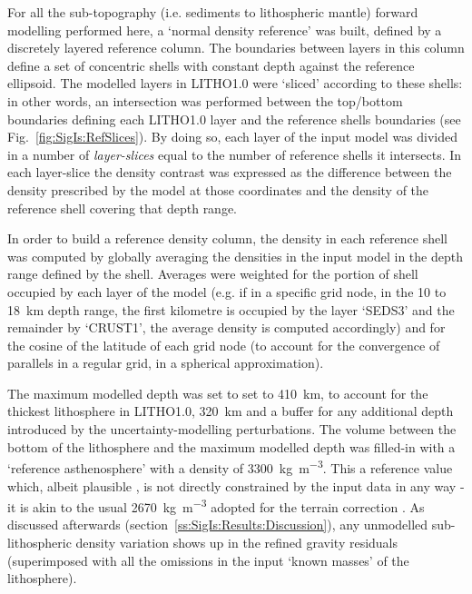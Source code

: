 For all the sub-topography (i.e. sediments to lithospheric mantle) forward modelling performed here, a `normal density reference' was built, defined by a discretely layered reference column.
The boundaries between layers in this column define a set of concentric shells with constant depth against the reference ellipsoid.
The modelled layers in {LITHO1.0} were `sliced' according to these shells: in other words, an intersection was performed between the top/bottom boundaries defining each {LITHO1.0} layer and the reference shells boundaries (see Fig.~\ref{fig:SigIs:RefSlices}).
By doing so, each layer of the input model was divided in a number of \textit{layer-slices} equal to the number of reference shells it intersects.
In each layer-slice the density contrast was expressed as the difference between the density prescribed by the model at those coordinates and the density of the reference shell covering that depth range.

In order to build a reference density column, the density in each reference shell was computed by globally averaging the densities in the input model in the depth range defined by the shell.
Averages were weighted for the portion of shell occupied by each layer of the model (e.g. if in a specific grid node, in the \num{10} to \SI{18}{km} depth range, the first kilometre is occupied by the layer `SEDS3' and the remainder by `CRUST1', the average density is computed accordingly) and for the cosine of the latitude of each grid node (to account for the convergence of parallels in a regular grid, in a spherical approximation).

The maximum modelled depth was set to set to \SI{410}{\kilo \metre}, to account for the thickest lithosphere in {LITHO1.0}, \SI{320}{\kilo \metre} and a buffer for any additional depth introduced by the uncertainty-modelling perturbations.
The volume between the bottom of the lithosphere and the maximum modelled depth was filled-in with a `reference asthenosphere' with a density of \SI{3300}{\kilo \gram \per \cubic \metre}.
This a reference value which, albeit plausible \parencite[e.g.][]{Bormann2002}, is not directly constrained by the input data in any way - it is akin to the usual \SI{2670}{\kilo \gram \per \cubic \metre} adopted for the terrain correction \parencite{Hinze2003}.
As discussed afterwards (section~\ref{ss:SigIs:Results:Discussion}), any unmodelled sub-lithospheric density variation shows up in the refined gravity residuals (superimposed with all the omissions in the input `known masses' of the lithosphere).

